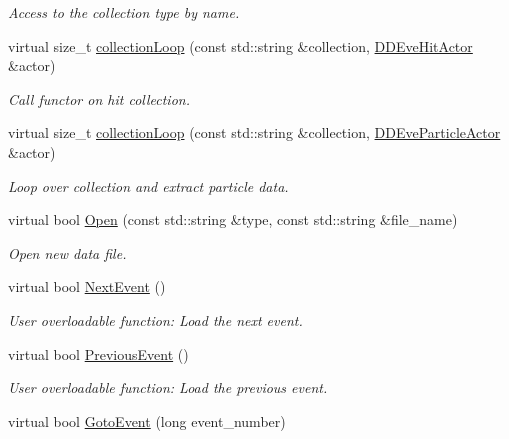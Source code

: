 \begin{DoxyCompactItemize}
\begin{DoxyCompactList}\small\item\em Access to the collection type by name. \end{DoxyCompactList}\item 
virtual size\+\_\+t \hyperlink{class_d_d4hep_1_1_d_d_g4_event_handler_a65645df58f694dea050f7d57d353dff4}{collection\+Loop} (const std\+::string \&collection, \hyperlink{struct_d_d4hep_1_1_d_d_eve_hit_actor}{D\+D\+Eve\+Hit\+Actor} \&actor)
\begin{DoxyCompactList}\small\item\em Call functor on hit collection. \end{DoxyCompactList}\item 
virtual size\+\_\+t \hyperlink{class_d_d4hep_1_1_d_d_g4_event_handler_a9f45863ae9406f8d5ec1d309321c50d6}{collection\+Loop} (const std\+::string \&collection, \hyperlink{struct_d_d4hep_1_1_d_d_eve_particle_actor}{D\+D\+Eve\+Particle\+Actor} \&actor)
\begin{DoxyCompactList}\small\item\em Loop over collection and extract particle data. \end{DoxyCompactList}\item 
virtual bool \hyperlink{class_d_d4hep_1_1_d_d_g4_event_handler_a110e487b2813985f56058382357f0754}{Open} (const std\+::string \&type, const std\+::string \&file\+\_\+name)
\begin{DoxyCompactList}\small\item\em Open new data file. \end{DoxyCompactList}\item 
virtual bool \hyperlink{class_d_d4hep_1_1_d_d_g4_event_handler_a02ecd0dfced58988ab84242cb9fdfd44}{Next\+Event} ()
\begin{DoxyCompactList}\small\item\em User overloadable function\+: Load the next event. \end{DoxyCompactList}\item 
virtual bool \hyperlink{class_d_d4hep_1_1_d_d_g4_event_handler_a20cafa8eac655886d4a3d69338e7e947}{Previous\+Event} ()
\begin{DoxyCompactList}\small\item\em User overloadable function\+: Load the previous event. \end{DoxyCompactList}\item 
virtual bool \hyperlink{class_d_d4hep_1_1_d_d_g4_event_handler_a3af4cf3191fabf450e81812e93d2502a}{Goto\+Event} (long event\+\_\+number)

\end{DoxyCompactItemize}
